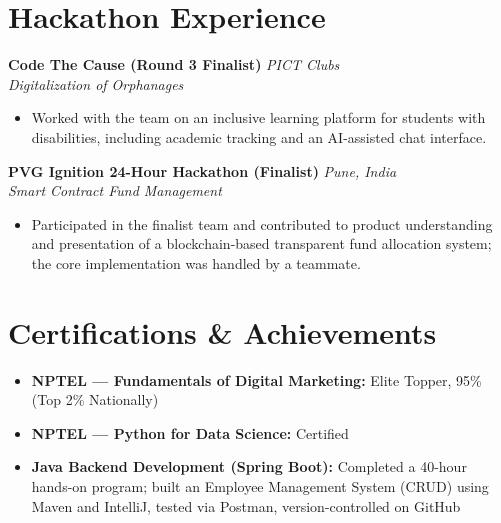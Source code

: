 \documentclass[11pt,a4paper]{article}
\begin{document}
\section*{Hackathon Experience}
\textbf{Code The Cause (Round 3 Finalist)} \hfill \textit{PICT Clubs} \\
\textit{Digitalization of Orphanages}
\begin{itemize}
    \item Worked with the team on an inclusive learning platform for students with disabilities, including academic tracking and an AI-assisted chat interface.
\end{itemize}
\textbf{PVG Ignition 24-Hour Hackathon (Finalist)} \hfill \textit{Pune, India} \\
\textit{Smart Contract Fund Management}
\begin{itemize}
    \item Participated in the finalist team and contributed to product understanding and presentation of a blockchain-based transparent fund allocation system; the core implementation was handled by a teammate.
\end{itemize}
\section*{Certifications \& Achievements}
\begin{itemize}[leftmargin=0.15in]
    \item \textbf{NPTEL — Fundamentals of Digital Marketing:} Elite Topper, 95\% (Top 2\% Nationally)
    \item \textbf{NPTEL — Python for Data Science:} Certified
    \item \textbf{Java Backend Development (Spring Boot):} Completed a 40-hour hands-on program; built an Employee Management System (CRUD) using Maven and IntelliJ, tested via Postman, version-controlled on GitHub
\end{itemize}
\end{document}
